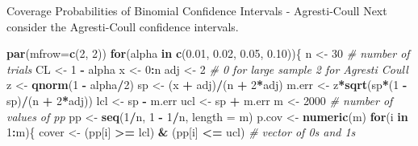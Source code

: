 \documentclass[
  ignorenonframetext,
]{beamer}
\newenvironment{Shaded}{\begin{snugshade}}{\end{snugshade}}
\newcommand{\AttributeTok}[1]{\textcolor[rgb]{0.13,0.29,0.53}{#1}}
\newcommand{\CommentTok}[1]{\textcolor[rgb]{0.56,0.35,0.01}{\textit{#1}}}
\newcommand{\ControlFlowTok}[1]{\textcolor[rgb]{0.13,0.29,0.53}{\textbf{#1}}}
\newcommand{\DecValTok}[1]{\textcolor[rgb]{0.00,0.00,0.81}{#1}}
\newcommand{\FloatTok}[1]{\textcolor[rgb]{0.00,0.00,0.81}{#1}}
\newcommand{\FunctionTok}[1]{\textcolor[rgb]{0.13,0.29,0.53}{\textbf{#1}}}
\newcommand{\NormalTok}[1]{#1}
\newcommand{\OtherTok}[1]{\textcolor[rgb]{0.56,0.35,0.01}{#1}}
\newcommand{\SpecialCharTok}[1]{\textcolor[rgb]{0.81,0.36,0.00}{\textbf{#1}}}
\begin{document}
\begin{frame}[fragile]{Coverage Probabilities of Binomial Confidence
Intervals - Agresti-Coull}
\protect\hypertarget{coverage-probabilities-of-binomial-confidence-intervals---agresti-coull}{}
Next consider the Agresti-Coull confidence intervals.

\tiny

\begin{Shaded}
\begin{Highlighting}[]
\FunctionTok{par}\NormalTok{(}\AttributeTok{mfrow=}\FunctionTok{c}\NormalTok{(}\DecValTok{2}\NormalTok{, }\DecValTok{2}\NormalTok{))}
\ControlFlowTok{for}\NormalTok{(alpha }\ControlFlowTok{in} \FunctionTok{c}\NormalTok{(}\FloatTok{0.01}\NormalTok{, }\FloatTok{0.02}\NormalTok{, }\FloatTok{0.05}\NormalTok{, }\FloatTok{0.10}\NormalTok{))\{}
\NormalTok{n }\OtherTok{\textless{}{-}} \DecValTok{30}     \CommentTok{\# number of trials}
\NormalTok{CL }\OtherTok{\textless{}{-}} \DecValTok{1} \SpecialCharTok{{-}}\NormalTok{ alpha}
\NormalTok{x }\OtherTok{\textless{}{-}} \DecValTok{0}\SpecialCharTok{:}\NormalTok{n }
\NormalTok{adj }\OtherTok{\textless{}{-}} \DecValTok{2}  \CommentTok{\# 0 for large sample 2 for Agresti Coull}
\NormalTok{z }\OtherTok{\textless{}{-}} \FunctionTok{qnorm}\NormalTok{(}\DecValTok{1} \SpecialCharTok{{-}}\NormalTok{ alpha}\SpecialCharTok{/}\DecValTok{2}\NormalTok{)}
\NormalTok{sp }\OtherTok{\textless{}{-}}\NormalTok{ (x }\SpecialCharTok{+}\NormalTok{ adj)}\SpecialCharTok{/}\NormalTok{(n }\SpecialCharTok{+} \DecValTok{2}\SpecialCharTok{*}\NormalTok{adj)}
\NormalTok{m.err }\OtherTok{\textless{}{-}}\NormalTok{ z}\SpecialCharTok{*}\FunctionTok{sqrt}\NormalTok{(sp}\SpecialCharTok{*}\NormalTok{(}\DecValTok{1} \SpecialCharTok{{-}}\NormalTok{ sp)}\SpecialCharTok{/}\NormalTok{(n }\SpecialCharTok{+} \DecValTok{2}\SpecialCharTok{*}\NormalTok{adj))}
\NormalTok{lcl }\OtherTok{\textless{}{-}}\NormalTok{ sp }\SpecialCharTok{{-}}\NormalTok{ m.err}
\NormalTok{ucl }\OtherTok{\textless{}{-}}\NormalTok{ sp }\SpecialCharTok{+}\NormalTok{ m.err}
\NormalTok{m }\OtherTok{\textless{}{-}} \DecValTok{2000} \CommentTok{\# number of values of pp}
\NormalTok{pp }\OtherTok{\textless{}{-}} \FunctionTok{seq}\NormalTok{(}\DecValTok{1}\SpecialCharTok{/}\NormalTok{n, }\DecValTok{1} \SpecialCharTok{{-}} \DecValTok{1}\SpecialCharTok{/}\NormalTok{n, }\AttributeTok{length =}\NormalTok{ m)}
\NormalTok{p.cov }\OtherTok{\textless{}{-}} \FunctionTok{numeric}\NormalTok{(m)}
\ControlFlowTok{for}\NormalTok{(i }\ControlFlowTok{in} \DecValTok{1}\SpecialCharTok{:}\NormalTok{m)\{}
\NormalTok{  cover }\OtherTok{\textless{}{-}}\NormalTok{ (pp[i] }\SpecialCharTok{\textgreater{}=}\NormalTok{ lcl) }\SpecialCharTok{\&}\NormalTok{ (pp[i] }\SpecialCharTok{\textless{}=}\NormalTok{ ucl)  }\CommentTok{\# vector of 0s and 1s}

\end{Highlighting}
\end{Shaded}
\end{frame}
\end{document}
